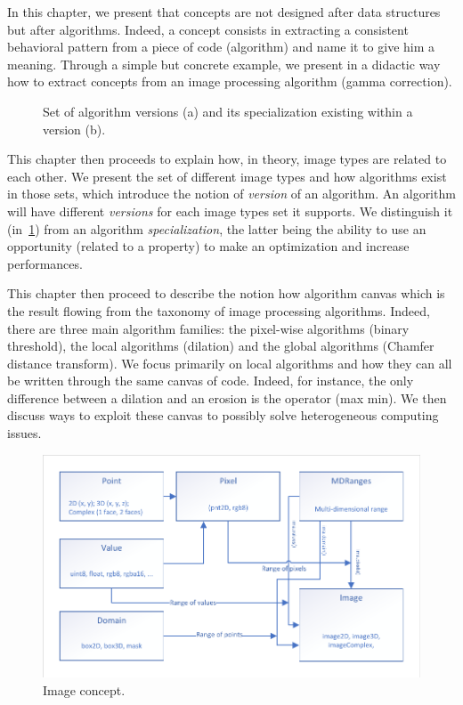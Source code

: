 In this chapter, we present that concepts are not designed after data structures but after algorithms. Indeed, a concept
consists in extracting a consistent behavioral pattern from a piece of code (algorithm) and name it to give him a
meaning. Through a simple but concrete example, we present in a didactic way how to extract concepts from an image
processing algorithm (gamma correction).

\begin{figure}[htbp]
  \centering
  \hfil
  \caption[]{Set of algorithm versions (a) and its specialization existing within a version (b).}
  \label{summary:fig:image.version.vs.specialization}
\end{figure}

This chapter then proceeds to explain how, in theory, image types are related to each other. We present the set of
different image types and how algorithms exist in those sets, which introduce the notion of \emph{version} of an
algorithm. An algorithm will have different \emph{versions} for each image types set it supports. We distinguish it
(in~\cref{summary:fig:image.version.vs.specialization}) from an algorithm \emph{specialization}, the latter being the
ability to use an opportunity (related to a property) to make an optimization and increase performances.

This chapter then proceed to describe the notion how algorithm canvas which is the result flowing from the taxonomy of
image processing algorithms. Indeed, there are three main algorithm families: the pixel-wise algorithms (binary
threshold), the local algorithms (dilation) and the global algorithms (Chamfer distance transform). We focus primarily
on local algorithms and how they can all be written through the same canvas of code. Indeed, for instance, the only
difference between a dilation and an erosion is the operator (max \vs min). We then discuss ways to exploit these canvas
to possibly solve heterogeneous computing issues.

\begin{figure}[htbp]
  \centering
  \includegraphics[width=.8\linewidth]{../figures/concepts/image}
  \caption[]{Image concept.}
  \label{summary:fig:concept.image}
\end{figure}

